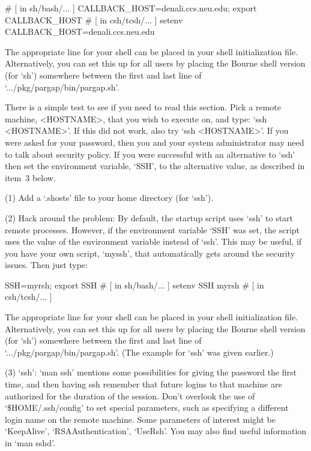\begintt
# [ in sh/bash/... ]
CALLBACK_HOST=denali.ccs.neu.edu; export CALLBACK_HOST
# [ in csh/tcsh/... ]
setenv CALLBACK_HOST=denali.ccs.neu.edu
\endtt

The appropriate  line  for  your  shell  can  be  placed  in  your  shell
initialization file. Alternatively, you can set this up for all users  by
placing the Bourne shell version (for `sh') somewhere between  the  first
and last line of `.../pkg/pargap/bin/pargap.sh'.


There is a simple test to see if you need to read this  section.  Pick  a
remote machine, <HOSTNAME>, that you wish to execute on, and  type:  `ssh
<HOSTNAME>'. If this did not work, also try `ssh <HOSTNAME>'. If you were
asked for your password, then you and your system administrator may  need
to talk about security policy. If you were successful with an alternative
to `ssh' then  set  the environment  variable, `SSH', to  the alternative
value, as described in item~3 below.

\beginlist
\item{(1)}
    Add a `.shosts' file to your home directory (for `ssh').

\item{(2)}
    Hack around the problem: By default, the startup script uses `ssh' to
    start remote processes. However, if the  environment  variable  `SSH'
    was set, the script  uses  the  value  of  the  environment  variable
    instead of `ssh'. This may be useful, if you have  your  own  script,
    `myssh', that automatically gets around  the  security  issues.  Then
    just type:

\begintt
SSH=myrsh; export SSH  # [ in sh/bash/... ]
setenv SSH myrsh       # [ in csh/tcsh/... ]
\endtt

\item{}
    The appropriate line for your shell  can  be  placed  in  your  shell
    initialization file. Alternatively, you can set this up for all users
    by placing the Bourne shell version (for `sh') somewhere between  the
    first and last line of `.../pkg/pargap/bin/pargap.sh'.  (The  example
    for `ssh' was given earlier.)

\item{(3)}
    `ssh': `man ssh' mentions some possibilities for giving the  password
    the first time, and then having ssh remember that  future  logins  to
    that machine are authorized for the duration of  the  session.  Don't
    overlook the use of `\$HOME/.ssh/config' to set  special  parameters,
    such as specifying a different login name on the remote machine. Some
    parameters of interest  might  be  `KeepAlive',  `RSAAuthentication',
    `UseRsh'. You may also find useful information in `man sshd'.

